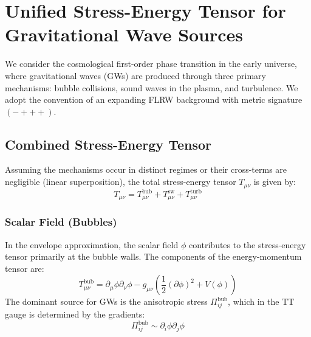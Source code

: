 \documentclass{article}
\begin{document}

\section{Unified Stress-Energy Tensor for Gravitational Wave Sources}

We consider the cosmological first-order phase transition in the early universe, where gravitational waves (GWs) are produced through three primary mechanisms: bubble collisions, sound waves in the plasma, and turbulence. We adopt the convention of an expanding FLRW background with metric signature $(-+++)$.

\subsection{Combined Stress-Energy Tensor}

Assuming the mechanisms occur in distinct regimes or their cross-terms are negligible (linear superposition), the total stress-energy tensor $T_{\mu\nu}$ is given by:
\begin{equation}
    T_{\mu\nu} = T_{\mu\nu}^{\text{bub}} + T_{\mu\nu}^{\text{sw}} + T_{\mu\nu}^{\text{turb}}
\end{equation}

\subsubsection{Scalar Field (Bubbles)}
In the envelope approximation, the scalar field $\phi$ contributes to the stress-energy tensor primarily at the bubble walls. The components of the energy-momentum tensor are:
\begin{equation}
    T_{\mu\nu}^{\text{bub}} = \partial_\mu \phi \partial_\nu \phi - g_{\mu\nu} \left( \frac{1}{2} (\partial \phi)^2 + V(\phi) \right)
\end{equation}
The dominant source for GWs is the anisotropic stress $\Pi_{ij}^{\text{bub}}$, which in the TT gauge is determined by the gradients:
\begin{equation}
    \Pi_{ij}^{\text{bub}} \sim \partial_i \phi \partial_j \phi
\end{equation}
\end{document}
